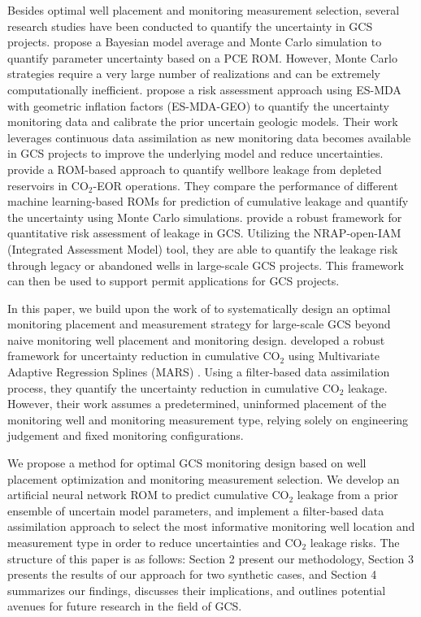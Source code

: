 \documentclass[a4paper,fleqn]{cas-sc}
\begin{document}
Besides optimal well placement and monitoring measurement selection, several research studies have been conducted to quantify the uncertainty in GCS projects. \citet{Jia2018104} propose a Bayesian model average and Monte Carlo simulation to quantify parameter uncertainty based on a PCE ROM. However, Monte Carlo strategies require a very large number of realizations and can be extremely computationally inefficient. \citet{Chen2020} propose a risk assessment approach using ES-MDA with geometric inflation factors (ES-MDA-GEO) to quantify the uncertainty monitoring data and calibrate the prior uncertain geologic models. Their work leverages continuous data assimilation as new monitoring data becomes available in GCS projects to improve the underlying model and reduce uncertainties. \citet{Mehana2022} provide a ROM-based approach to quantify wellbore leakage from depleted reservoirs in CO$_2$-EOR operations. They compare the performance of different machine learning-based ROMs for prediction of cumulative leakage and quantify the uncertainty using Monte Carlo simulations. \citet{Pawar2022} provide a robust framework for quantitative risk assessment of leakage in GCS. Utilizing the NRAP-open-IAM (Integrated Assessment Model) tool, they are able to quantify the leakage risk through legacy or abandoned wells in large-scale GCS projects. This framework can then be used to support permit applications for GCS projects. 

In this paper, we build upon the work of \citet{Chen2018} to systematically design an optimal monitoring placement and measurement strategy for large-scale GCS beyond naive monitoring well placement and monitoring design. \citet{Chen2018} developed a robust framework for uncertainty reduction in cumulative CO$_2$ using Multivariate Adaptive Regression Splines (MARS) \citep{Friedman19911}. Using a filter-based data assimilation process, they quantify the uncertainty reduction in cumulative CO$_2$ leakage. However, their work assumes a predetermined, uninformed placement of the monitoring well and monitoring measurement type, relying solely on engineering judgement and fixed monitoring configurations.

We propose a method for optimal GCS monitoring design based on well placement optimization and monitoring measurement selection. We develop an artificial neural network ROM to predict cumulative CO$_2$ leakage from a prior ensemble of uncertain model parameters, and implement a filter-based data assimilation approach to select the most informative monitoring well location and measurement type in order to reduce uncertainties and CO$_2$ leakage risks. The structure of this paper is as follows: Section 2 present our methodology, Section 3 presents the results of our approach for two synthetic cases, and Section 4 summarizes our findings, discusses their implications, and outlines potential avenues for future research in the field of GCS.
\end{document}
